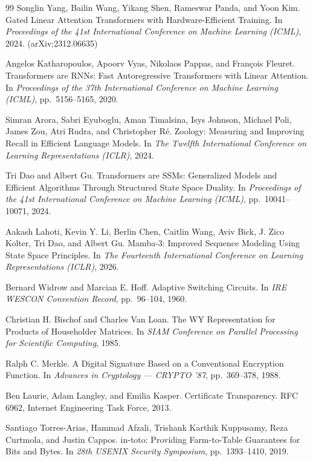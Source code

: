 \documentclass[11pt]{article}
\begin{document}
\begin{thebibliography}{99}
 Songlin Yang, Bailin Wang, Yikang Shen, Rameswar Panda, and Yoon Kim. Gated Linear Attention Transformers with Hardware-Efficient Training. In \emph{Proceedings of the 41st International Conference on Machine Learning (ICML)}, 2024. (arXiv:2312.06635)

 Angelos Katharopoulos, Apoorv Vyas, Nikolaos Pappas, and Fran{\c{c}}ois Fleuret. Transformers are {RNN}s: Fast Autoregressive Transformers with Linear Attention. In \emph{Proceedings of the 37th International Conference on Machine Learning (ICML)}, pp.~5156--5165, 2020.

 Simran Arora, Sabri Eyuboglu, Aman Timalsina, Isys Johnson, Michael Poli, James Zou, Atri Rudra, and Christopher R{\'e}. Zoology: Measuring and Improving Recall in Efficient Language Models. In \emph{The Twelfth International Conference on Learning Representations (ICLR)}, 2024.

 Tri Dao and Albert Gu. Transformers are {SSM}s: Generalized Models and Efficient Algorithms Through Structured State Space Duality. In \emph{Proceedings of the 41st International Conference on Machine Learning (ICML)}, pp.~10041--10071, 2024.

 Aakash Lahoti, Kevin Y. Li, Berlin Chen, Caitlin Wang, Aviv Bick, J. Zico Kolter, Tri Dao, and Albert Gu. Mamba-3: Improved Sequence Modeling Using State Space Principles. In \emph{The Fourteenth International Conference on Learning Representations (ICLR)}, 2026.

 Bernard Widrow and Marcian E. Hoff. Adaptive Switching Circuits. In \emph{IRE WESCON Convention Record}, pp.~96--104, 1960.

 Christian H. Bischof and Charles Van Loan. The {WY} Representation for Products of Householder Matrices. In \emph{SIAM Conference on Parallel Processing for Scientific Computing}, 1985.

 Ralph C. Merkle. A Digital Signature Based on a Conventional Encryption Function. In \emph{Advances in Cryptology --- CRYPTO '87}, pp.~369--378, 1988.

 Ben Laurie, Adam Langley, and Emilia Kasper. Certificate Transparency. RFC 6962, Internet Engineering Task Force, 2013.

 Santiago Torres-Arias, Hammad Afzali, Trishank Karthik Kuppusamy, Reza Curtmola, and Justin Cappos. in-toto: Providing Farm-to-Table Guarantees for Bits and Bytes. In \emph{28th USENIX Security Symposium}, pp.~1393--1410, 2019.


\end{thebibliography}
\end{document}
